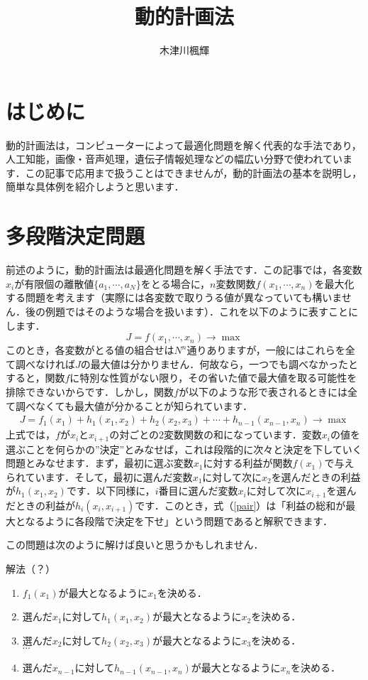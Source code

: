\documentclass[a5paper]{jarticle}
\title{動的計画法}
\author{木津川楓輝}
\date{}
\begin{document}
\maketitle
\thispagestyle{empty}
\section{はじめに}
動的計画法は，コンピューターによって最適化問題を解く代表的な手法であり，人工知能，画像・音声処理，遺伝子情報処理などの幅広い分野で使われています．この記事で応用まで扱うことはできませんが，動的計画法の基本を説明し，簡単な具体例を紹介しようと思います．
\section{多段階決定問題}
前述のように，動的計画法は最適化問題を解く手法です．この記事では，各変数$x_i$が有限個の離散値$\{a_1, \cdots, a_N\}$をとる場合に，$n$変数関数$f(x_1, \cdots, x_n)$を最大化する問題を考えます（実際には各変数で取りうる値が異なっていても構いません．後の例題ではそのような場合を扱います）．これを以下のように表すことにします．
\[
J = f(x_1, \cdots, x_n) \rightarrow \max
\]
このとき，各変数がとる値の組合せは$N^n$通りありますが，一般にはこれらを全て調べなければ$J$の最大値は分かりません．何故なら，一つでも調べなかったとすると，関数$f$に特別な性質がない限り，その省いた値で最大値を取る可能性を排除できないからです．しかし，関数$f$が以下のような形で表されるときには全て調べなくても最大値が分かることが知られています．
\begin{eqnarray}
\label{pair}
J = f_1(x_1) + h_1(x_1, x_2) + h_2(x_2, x_3) + \cdots + h_{n - 1}(x_{n - 1}, x_n) \rightarrow \max
\end{eqnarray}
上式では，$f$が$x_i$と$x_{i + 1}$の対ごとの2変数関数の和になっています．変数$x_i$の値を選ぶことを何らかの”決定”とみなせば，これは段階的に次々と決定を下していく問題とみなせます．まず，最初に選ぶ変数$x_1$に対する利益が関数$f(x_1)$で与えられています．そして，最初に選んだ変数$x_1$に対して次に$x_2$を選んだときの利益が$h_1(x_1, x_2)$です．以下同様に，$i$番目に選んだ変数$x_i$に対して次に$x_{i + 1}$を選んだときの利益が$h_i(x_i, x_{i + 1})$です．このとき，式（\ref{pair}）は「利益の総和が最大となるように各段階で決定を下せ」という問題であると解釈できます．

この問題は次のように解けば良いと思うかもしれません．
\begin{itembox}[l]{解法（？）}
\begin{enumerate}
   \item $f_1(x_1)$が最大となるように$x_1$を決める．
   \item 選んだ$x_1$に対して$h_1(x_1, x_2)$が最大となるように$x_2$を決める．
   \item 選んだ$x_2$に対して$h_2(x_2, x_3)$が最大となるように$x_3$を決める．\\ $\cdots$
   \item 選んだ$x_{n - 1}$に対して$h_{n - 1}(x_{n - 1}, x_n)$が最大となるように$x_n$を決める．
\end{enumerate}
\end{itembox}
\end{document}
